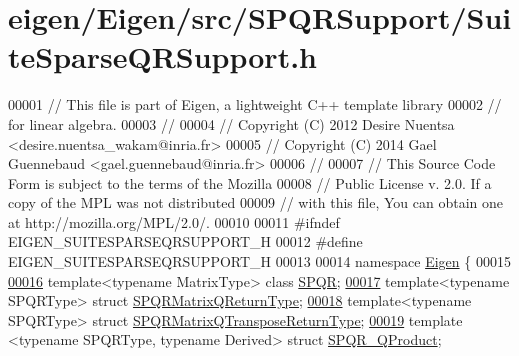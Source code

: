 \hypertarget{eigen_2_eigen_2src_2_s_p_q_r_support_2_suite_sparse_q_r_support_8h_source}{}\section{eigen/\+Eigen/src/\+S\+P\+Q\+R\+Support/\+Suite\+Sparse\+Q\+R\+Support.h}
\label{eigen_2_eigen_2src_2_s_p_q_r_support_2_suite_sparse_q_r_support_8h_source}

\begin{DoxyCode}
00001 \textcolor{comment}{// This file is part of Eigen, a lightweight C++ template library}
00002 \textcolor{comment}{// for linear algebra.}
00003 \textcolor{comment}{//}
00004 \textcolor{comment}{// Copyright (C) 2012 Desire Nuentsa <desire.nuentsa\_wakam@inria.fr>}
00005 \textcolor{comment}{// Copyright (C) 2014 Gael Guennebaud <gael.guennebaud@inria.fr>}
00006 \textcolor{comment}{//}
00007 \textcolor{comment}{// This Source Code Form is subject to the terms of the Mozilla}
00008 \textcolor{comment}{// Public License v. 2.0. If a copy of the MPL was not distributed}
00009 \textcolor{comment}{// with this file, You can obtain one at http://mozilla.org/MPL/2.0/.}
00010 
00011 \textcolor{preprocessor}{#ifndef EIGEN\_SUITESPARSEQRSUPPORT\_H}
00012 \textcolor{preprocessor}{#define EIGEN\_SUITESPARSEQRSUPPORT\_H}
00013 
00014 \textcolor{keyword}{namespace }\hyperlink{namespace_eigen}{Eigen} \{
00015   
\hyperlink{class_eigen_1_1_s_p_q_r}{00016}   \textcolor{keyword}{template}<\textcolor{keyword}{typename} MatrixType> \textcolor{keyword}{class }\hyperlink{class_eigen_1_1_s_p_q_r}{SPQR}; 
\hyperlink{struct_eigen_1_1_s_p_q_r_matrix_q_return_type}{00017}   \textcolor{keyword}{template}<\textcolor{keyword}{typename} SPQRType> \textcolor{keyword}{struct }\hyperlink{struct_eigen_1_1_s_p_q_r_matrix_q_return_type}{SPQRMatrixQReturnType}; 
\hyperlink{struct_eigen_1_1_s_p_q_r_matrix_q_transpose_return_type}{00018}   \textcolor{keyword}{template}<\textcolor{keyword}{typename} SPQRType> \textcolor{keyword}{struct }\hyperlink{struct_eigen_1_1_s_p_q_r_matrix_q_transpose_return_type}{SPQRMatrixQTransposeReturnType}; 
\hyperlink{struct_eigen_1_1_s_p_q_r___q_product}{00019}   \textcolor{keyword}{template} <\textcolor{keyword}{typename} SPQRType, \textcolor{keyword}{typename} Derived> \textcolor{keyword}{struct }\hyperlink{struct_eigen_1_1_s_p_q_r___q_product}{SPQR\_QProduct};

\end{DoxyCode}
